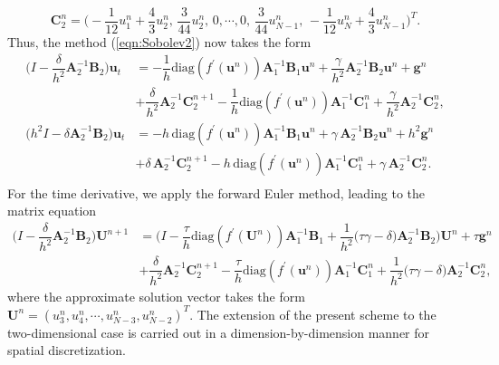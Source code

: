 \documentclass[11pt,a4paper]{amsart}
\theoremstyle{plain}
\theoremstyle{definition}
\theoremstyle{remark}
\numberwithin{equation}{section}
\begin{document}
\begin{equation} 
\mathbf{C}_2^{n} = \Biggl( -\dfrac{1}{12}u_1^n+\dfrac{4}{3}u_2^n,\, \dfrac{3}{44}u_2^n,\, 0, \cdots, 0,\, \dfrac{3}{44}u_{N-1}^n ,\, -\dfrac{1}{12}u_{N}^n +\dfrac{4}{3}u_{N-1}^n \Biggr)^T.
\end{equation}
Thus, the method (\ref{eqn:Sobolev2}) now takes the form
\begin{equation}
\begin{split}
       \Biggl( I -\dfrac{\delta}{h^2} \mathbf{A}_2^{-1}\mathbf{B}_2 \Biggr) \mathbf{u}_t &=  -\dfrac{1}{h} \text{diag}(f^{\prime}(\mathbf{u}^n))\mathbf{A}_1^{-1}\mathbf{B}_1 \mathbf{u}^n + \dfrac{\gamma}{h^2} \mathbf{A}_2^{-1}\mathbf{B}_2  \mathbf{u}^n + \mathbf{g}^n\\
        & + \dfrac{\delta}{h^2} \mathbf{A}_2^{-1}\mathbf{C}_2^{n+1} -\dfrac{1}{h}\text{diag}(f^{\prime}(\mathbf{u}^n))\mathbf{A}_1^{-1}\mathbf{C}_1^n + \dfrac{\gamma}{h^2} \mathbf{A}_2^{-1}\mathbf{C}_2^{n},\\  
       \Biggl( h^2I -\delta \mathbf{A}_2^{-1}\mathbf{B}_2\Biggr) \mathbf{u}_t &= -h \, \text{diag}(f^{\prime}(\mathbf{u}^n))\mathbf{A}_1^{-1}\mathbf{B}_1 \mathbf{u}^n + \gamma \, \mathbf{A}_2^{-1}\mathbf{B}_2  \mathbf{u}^n + h^2\mathbf{g}^n\\
        & + \delta \, \mathbf{A}_2^{-1}\mathbf{C}_2^{n+1} -h\, \text{diag}(f^{\prime}(\mathbf{u}^n))\mathbf{A}_1^{-1}\mathbf{C}_1^n + \gamma \, \mathbf{A}_2^{-1}\mathbf{C}_2^{n}.\\ 
\end{split}       
\end{equation}
For the time derivative, we apply the forward Euler method, leading to the matrix equation
\begin{equation}
\begin{split}
  \Biggl( I - \dfrac{\delta}{h^2} \mathbf{A}_2^{-1}\mathbf{B}_2\Biggr) \mathbf{U}^{n+1} &= \Biggl(I - \dfrac{\tau}{h} \text{diag}(f^{\prime}(\mathbf{U}^n))\mathbf{A}_1^{-1}\mathbf{B}_1 + \dfrac{1}{h^2}\biggl(\tau \gamma - \delta  \biggr) \mathbf{A}_2^{-1}\mathbf{B}_2 \Biggr) \mathbf{U}^{n} + \tau \mathbf{g}^n  \\
  & + \dfrac{\delta}{h^2} \mathbf{A}_2^{-1}\mathbf{C}_2^{n+1} -\dfrac{\tau}{h}\text{diag}(f^{\prime}(\mathbf{u}^n))\mathbf{A}_1^{-1}\mathbf{C}_1^n + \dfrac{1}{h^2}\biggl(\tau \gamma - \delta  \biggr) \mathbf{A}_2^{-1}\mathbf{C}_2^{n},
  \end{split} 
\end{equation}
where the approximate solution vector takes the form $\mathbf{U}^{n} = (u_{3}^n, u_{4}^n, \cdots, u_{N-3}^n, u_{N-2}^n)^T$. The extension of the present scheme to the two-dimensional case is carried out in a dimension-by-dimension manner for spatial discretization.
\end{document}
